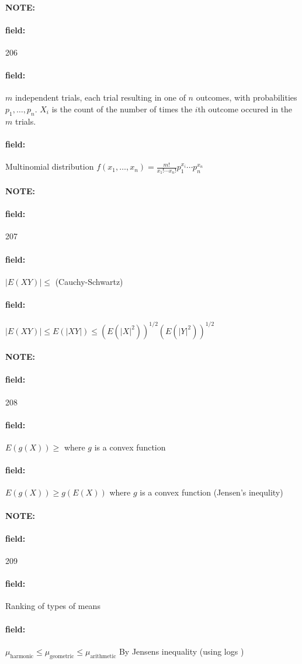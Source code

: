 \documentclass[12pt]{article}
\newenvironment{note}{\paragraph{NOTE:}}{}
\newenvironment{field}{\paragraph{field:}}{}
\begin{document}
\begin{note} \begin{field} \tiny 206 \end{field}
  \begin{field}
    $m$ independent trials, each trial resulting in one of $n$ outcomes, with probabilities $p_1, \ldots, p_n$. $X_i$ is the count of the number of times the $i$th outcome occured in the $m$ trials.
  \end{field}
  \begin{field}
    Multinomial distribution
    $f(x_1, \ldots, x_n) = \frac{m!}{x_1! \cdots x_n!}p_1^{x_i} \cdots p_n^{x_n}$
  \end{field}
\end{note}

\begin{note} \begin{field} \tiny 207 \end{field}
  \begin{field}
    $|E(XY)| \leq $ (Cauchy-Schwartz)
  \end{field}
  \begin{field}
    $|E(XY)| \leq E(|XY|) \leq (E(|X|^2))^{1/2}(E(|Y|^2))^{1/2}$
  \end{field}
\end{note}


\begin{note} \begin{field} \tiny 208 \end{field}
  \begin{field}
    $E(g(X)) \geq $ where $g$ is a convex function
  \end{field}
  \begin{field}
    $E(g(X)) \geq g(E(X))$ where $g$ is a convex function (Jensen's inequlity)
  \end{field}
\end{note}

\begin{note} \begin{field} \tiny 209 \end{field}
  \begin{field}
    Ranking of types of means
  \end{field}
  \begin{field}
    $\mu_{\text{harmonic}} \leq \mu_{\text{geometric}} \leq \mu_{\text{arithmetic}}$ By Jensens inequality (using logs )
  \end{field}
\end{note}
\end{document}
